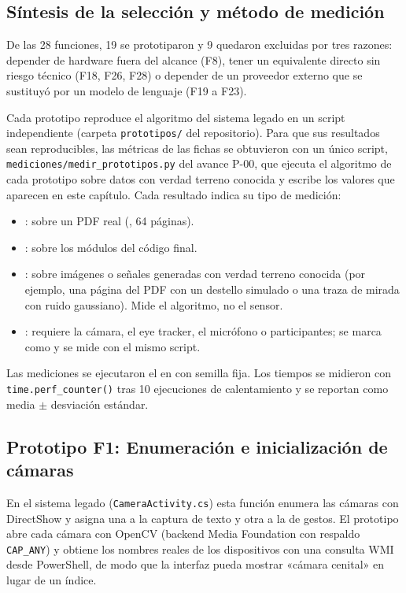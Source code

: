 \subsection{Síntesis de la selección y método de medición}

De las 28 funciones, 19 se prototiparon y 9 quedaron excluidas por tres razones: depender de hardware fuera del alcance (F8), tener un equivalente directo sin riesgo técnico (F18, F26, F28) o depender de un proveedor externo que se sustituyó por un modelo de lenguaje (F19 a F23).

Cada prototipo reproduce el algoritmo del sistema legado en un script independiente (carpeta \texttt{prototipos/} del repositorio). Para que sus resultados sean reproducibles, las métricas de las fichas se obtuvieron con un único script, \texttt{mediciones/medir\_prototipos.py} del avance P-00, que ejecuta el algoritmo de cada prototipo sobre datos con verdad terreno conocida y escribe los valores que aparecen en este capítulo. Cada resultado indica su tipo de medición:

\begin{itemize}
  \item {}: sobre un PDF real (\MedicionPDF, 64 páginas).
  \item {}: sobre los módulos del código final.
  \item {}: sobre imágenes o señales generadas con verdad terreno conocida (por ejemplo, una página del PDF con un destello simulado o una traza de mirada con ruido gaussiano). Mide el algoritmo, no el sensor.
  \item {}: requiere la cámara, el eye tracker, el micrófono o participantes; se marca como  y se mide con el mismo script.
\end{itemize}

Las mediciones se ejecutaron el \MedicionFecha{} en \MedicionSistema{} con semilla fija. Los tiempos se midieron con \texttt{time.perf\_counter()} tras 10 ejecuciones de calentamiento y se reportan como media $\pm$ desviación estándar.

\subsection{Prototipo F1: Enumeración e inicialización de cámaras}

En el sistema legado (\texttt{CameraActivity.cs}) esta función enumera las cámaras con DirectShow y asigna una a la captura de texto y otra a la de gestos. El prototipo abre cada cámara con OpenCV (backend Media Foundation con respaldo \texttt{CAP\_ANY}) y obtiene los nombres reales de los dispositivos con una consulta WMI desde PowerShell, de modo que la interfaz pueda mostrar «cámara cenital» en lugar de un índice.

